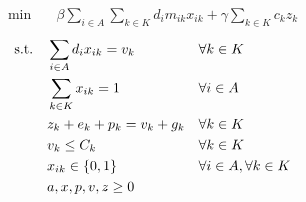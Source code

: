 \begin{align}
    \min\quad       & \beta \sum_{i \in A} \sum_{k \in K}{d_{i} m_{ik} x_{ik}} + \gamma \sum_{k \in K}{c_k z_k}
    \label{eq:migr0-obj}
\end{align}
\vspace*{-10mm}
\begin{align}
    \text{s.t.\quad}
    \label{eq:migr0-c1}
    & \sum_{i \in A}{d_i x_{ik}} = v_k              &   & \forall k \in K                  \\
    \label{eq:migr0-c2}
    & \sum_{k \in K}{x_{ik}} = 1                    &   & \forall i \in A                  \\
    \label{eq:migr0-c3}
    & z_k + e_k + p_k = v_k + g_k                   &   & \forall k \in K                  \\
    \label{eq:migr0-c4}
    & v_k \leq C_k                                  &   & \forall k \in K                  \\
    \label{eq:migr0-c5}
    & x_{ik} \in \{0,1\}                            &   & \forall i \in A, \forall k \in K \\
    \label{eq:migr0-c6}
    & a, x, p, v, z \geq 0                          &   &
\end{align}
